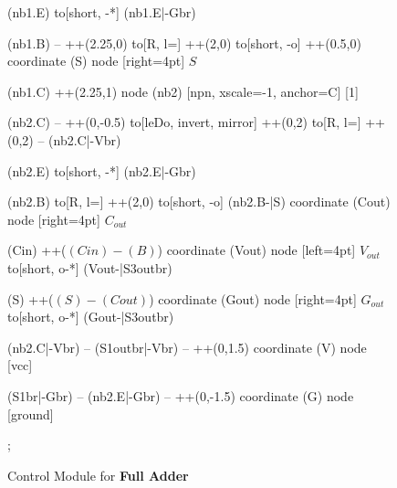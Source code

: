 \documentclass[a4paper, 10pt]{article}
\begin{document}
\begin{figure}[!h]
{\begin{circuitikz}[american]
		(nb1.E) to[short, -*] (nb1.E|-Gbr)

		(nb1.B) -- ++(2.25,0)
		to[R, l=\baseResistor] ++(2,0)
		to[short, -o] ++(0.5,0)
		coordinate (S)
		node [right=4pt] {$S$}

		(nb1.C) ++(2.25,1)
		node (nb2) [npn, xscale=-1, anchor=C] {
			\scalebox{-1}[1]{\gateTransistor}}

		(nb2.C) -- ++(0,-0.5)
		to[leDo, invert, mirror] ++(0,2)
		to[R, l=\ledResistor] ++(0,2)
		-- (nb2.C|-Vbr)

		(nb2.E) to[short, -*] (nb2.E|-Gbr)

		(nb2.B) to[R, l=\baseResistor] ++(2,0)
		to[short, -o] (nb2.B-|S)
		coordinate (Cout)
		node [right=4pt] {$C_{out}$}

		(Cin) ++($(Cin)-(B)$)
		coordinate (Vout)
		node [left=4pt] {$V_{out}$}
		to[short, o-*] (Vout-|S3outbr)

		(S) ++($(S)-(Cout)$)
		coordinate (Gout)
		node [right=4pt] {$G_{out}$}
		to[short, o-*] (Gout-|S3outbr)

		(nb2.C|-Vbr) -- (S1outbr|-Vbr)
		-- ++(0,1.5)
		coordinate (V)
		node [vcc] {\vccPotential}

		(S1br|-Gbr) -- (nb2.E|-Gbr)
		-- ++(0,-1.5)
		coordinate (G)
		node [ground] {}

		;

	\end{circuitikz}
	}
	\caption{Control Module for \textbf{Full Adder}}
\end{figure}
\end{document}
